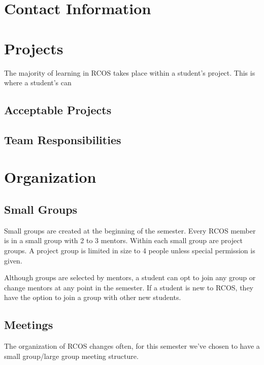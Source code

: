 \documentclass[12pt]{article}
\begin{document}
    \section{Contact Information}


    \section{Projects}

    The majority of learning in RCOS takes place within a student's project. This is where a student's can

    \subsection{Acceptable Projects}


    \subsection{Team Responsibilities}


    \section{Organization}

    \subsection{Small Groups}

    Small groups are created at the beginning of the semester. Every RCOS member is in a small group with 2 to 3 mentors. Within each small group are project groups. A project group is limited in size to 4 people unless special permission is given.

    Although groups are selected by mentors, a student can opt to join any group or change mentors at any point in the semester. If a student is new to RCOS, they have the option to join a group with other new students.

    \subsection{Meetings}

    The organization of RCOS changes often, for this semester we've chosen to have a small group/large group meeting structure.
\end{document}
